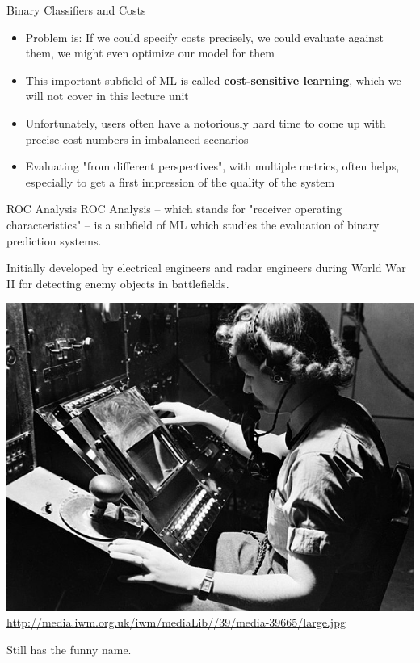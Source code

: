 \documentclass[11pt,compress,t,notes=noshow, xcolor=table]{beamer}
\begin{document}
 \begin{vbframe}{Binary Classifiers and Costs}
 \begin{itemize}
   \item Problem is: If we could specify costs precisely, we could evaluate against them, we might even optimize our model for them
   \item This important subfield of ML is called \textbf{cost-sensitive learning}, which we will not cover in this lecture unit
   \item Unfortunately, users often have a notoriously hard time to come up with precise cost numbers in imbalanced scenarios
   \item Evaluating "from different perspectives", with multiple metrics, often helps, especially to get a first impression
     of the quality of the system
 \end{itemize}
 \end{vbframe}
 
 \begin{frame}{ROC Analysis}
ROC Analysis -- which stands for "receiver operating characteristics" -- is a subfield of ML which studies the evaluation of binary prediction systems.

\lz

Initially developed by electrical engineers and radar engineers during World War II for detecting enemy objects in battlefields. 

\begin{center}
\includegraphics[width=.4\textwidth]{figure_man/receiver_operator.jpg}
{\tiny \url{http://media.iwm.org.uk/iwm/mediaLib//39/media-39665/large.jpg}}
\end{center}

Still has the funny name.
\end{frame}

 
\end{document}
